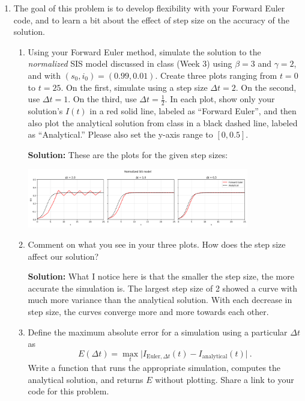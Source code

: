 \documentclass[11pt]{article}
\newenvironment{solution}{\par\noindent\begingroup\color{BrickRed}\textbf{Solution:} }{\par\endgroup}
\begin{document}
\begin{enumerate}
	\item The goal of this problem is to develop flexibility with your Forward Euler code, and to learn a bit about the effect of step size on the accuracy of the solution.
	
\begin{enumerate}[label=\alph*.]

	\item Using your Forward Euler method, simulate the solution to the {\it normalized} SIS model discussed in class (Week 3) using $\beta=3$ and $\gamma=2$, and with $(s_0, i_0) = (0.99, 0.01)$.
	 Create three plots ranging from $t=0$ to $t=25$. On the first, simulate using a step size $\Delta t=2$.
	 On the second, use $\Delta t =1$. On the third, use $\Delta t = \tfrac{1}{2}$. 
	 In each plot, show only your solution's $I(t)$ in a red solid line, labeled as ``Forward Euler'', and then also plot the analytical solution from class in a black dashed line, labeled as ``Analytical.''
	 Please also set the y-axis range to $[0,0.5]$. 

	\begin{solution}
	 These are the plots for the given step sizes:
	 \begin{center}
		\includegraphics[width=0.8\textwidth]{SIS-simulation.png}
	 \end{center}
	\end{solution}

	\item Comment on what you see in your three plots. How does the step size affect our solution?

	\begin{solution}
		What I notice here is that the smaller the step size, the more accurate the simulation is. 
		The largest step size of 2 showed a curve with much more variance than the analytical solution.
		With each decrease in step size, the curves converge more and more towards each other.
	\end{solution}

	\item Define the maximum absolute error for a simulation using a particular $\Delta t$ as 
	$$E(\Delta t) = \max_{t} \big | I_{\text{Euler}, \Delta t} (t) - I_\text{analytical}(t) \big |\ .$$ 
	Write a function that runs the appropriate simulation, computes the analytical solution, and returns $E$ without plotting. 
	Share a link to your code for this problem.


\end{enumerate}
\end{enumerate}
\end{document}
